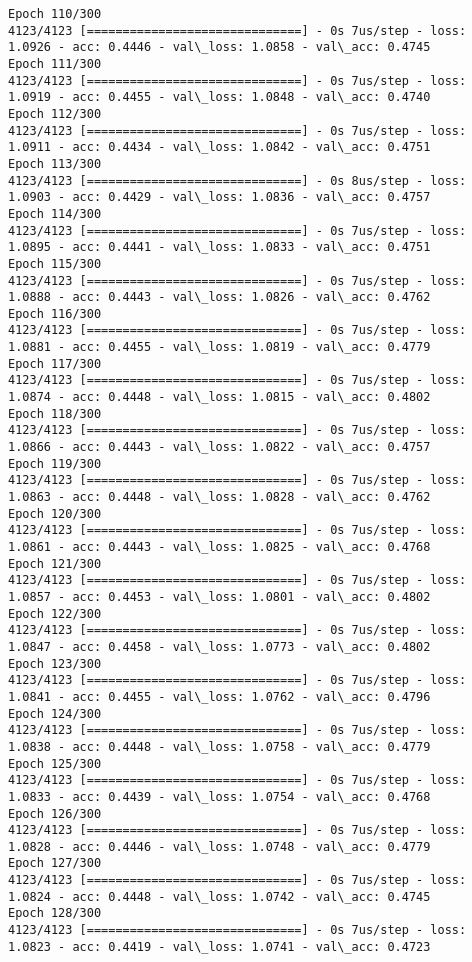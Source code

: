 \documentclass[11pt]{article}
\begin{document}
\begin{Verbatim}[commandchars=\\\{\}]
Epoch 110/300
4123/4123 [==============================] - 0s 7us/step - loss: 1.0926 - acc: 0.4446 - val\_loss: 1.0858 - val\_acc: 0.4745
Epoch 111/300
4123/4123 [==============================] - 0s 7us/step - loss: 1.0919 - acc: 0.4455 - val\_loss: 1.0848 - val\_acc: 0.4740
Epoch 112/300
4123/4123 [==============================] - 0s 7us/step - loss: 1.0911 - acc: 0.4434 - val\_loss: 1.0842 - val\_acc: 0.4751
Epoch 113/300
4123/4123 [==============================] - 0s 8us/step - loss: 1.0903 - acc: 0.4429 - val\_loss: 1.0836 - val\_acc: 0.4757
Epoch 114/300
4123/4123 [==============================] - 0s 7us/step - loss: 1.0895 - acc: 0.4441 - val\_loss: 1.0833 - val\_acc: 0.4751
Epoch 115/300
4123/4123 [==============================] - 0s 7us/step - loss: 1.0888 - acc: 0.4443 - val\_loss: 1.0826 - val\_acc: 0.4762
Epoch 116/300
4123/4123 [==============================] - 0s 7us/step - loss: 1.0881 - acc: 0.4455 - val\_loss: 1.0819 - val\_acc: 0.4779
Epoch 117/300
4123/4123 [==============================] - 0s 7us/step - loss: 1.0874 - acc: 0.4448 - val\_loss: 1.0815 - val\_acc: 0.4802
Epoch 118/300
4123/4123 [==============================] - 0s 7us/step - loss: 1.0866 - acc: 0.4443 - val\_loss: 1.0822 - val\_acc: 0.4757
Epoch 119/300
4123/4123 [==============================] - 0s 7us/step - loss: 1.0863 - acc: 0.4448 - val\_loss: 1.0828 - val\_acc: 0.4762
Epoch 120/300
4123/4123 [==============================] - 0s 7us/step - loss: 1.0861 - acc: 0.4443 - val\_loss: 1.0825 - val\_acc: 0.4768
Epoch 121/300
4123/4123 [==============================] - 0s 7us/step - loss: 1.0857 - acc: 0.4453 - val\_loss: 1.0801 - val\_acc: 0.4802
Epoch 122/300
4123/4123 [==============================] - 0s 7us/step - loss: 1.0847 - acc: 0.4458 - val\_loss: 1.0773 - val\_acc: 0.4802
Epoch 123/300
4123/4123 [==============================] - 0s 7us/step - loss: 1.0841 - acc: 0.4455 - val\_loss: 1.0762 - val\_acc: 0.4796
Epoch 124/300
4123/4123 [==============================] - 0s 7us/step - loss: 1.0838 - acc: 0.4448 - val\_loss: 1.0758 - val\_acc: 0.4779
Epoch 125/300
4123/4123 [==============================] - 0s 7us/step - loss: 1.0833 - acc: 0.4439 - val\_loss: 1.0754 - val\_acc: 0.4768
Epoch 126/300
4123/4123 [==============================] - 0s 7us/step - loss: 1.0828 - acc: 0.4446 - val\_loss: 1.0748 - val\_acc: 0.4779
Epoch 127/300
4123/4123 [==============================] - 0s 7us/step - loss: 1.0824 - acc: 0.4448 - val\_loss: 1.0742 - val\_acc: 0.4745
Epoch 128/300
4123/4123 [==============================] - 0s 7us/step - loss: 1.0823 - acc: 0.4419 - val\_loss: 1.0741 - val\_acc: 0.4723

\end{Verbatim}
\end{document}

